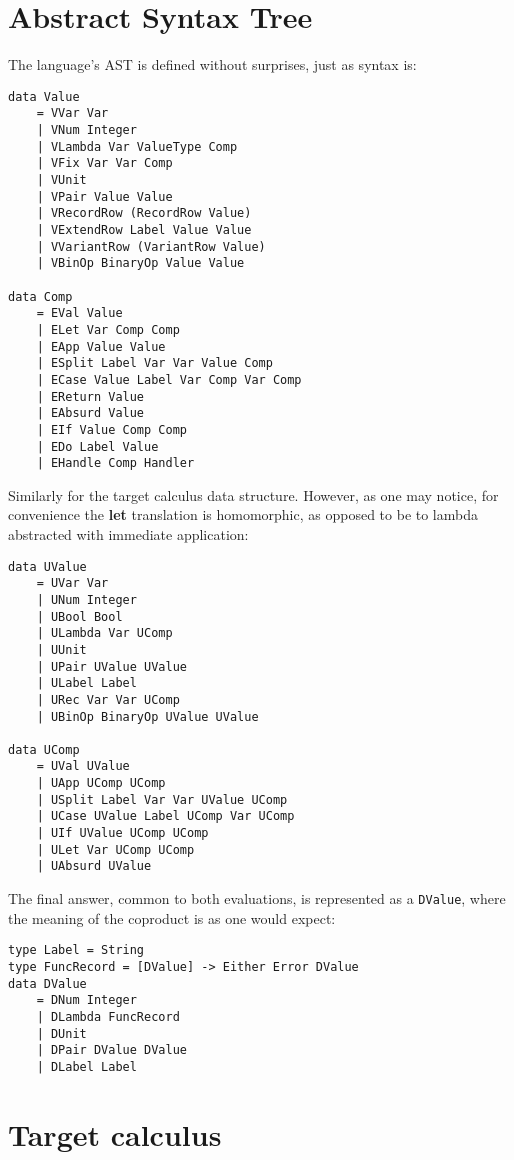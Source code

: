 \documentclass[declaration,shortabstract]{iithesis}
\theoremstyle{definition} \newtheorem{definition}{Definition}[chapter]
\theoremstyle{remark} \newtheorem{remark}[definition]{Observation}
\theoremstyle{plain} \newtheorem{theorem}[definition]{Theorem}
\theoremstyle{plain} \newtheorem{lemma}[definition]{Lemma}
\begin{document}
    \section{Abstract Syntax Tree}\label{sec:implementation-ast}

    The language's AST is defined without surprises, just as syntax is:

    \begin{verbatim}
data Value
    = VVar Var
    | VNum Integer
    | VLambda Var ValueType Comp
    | VFix Var Var Comp
    | VUnit
    | VPair Value Value
    | VRecordRow (RecordRow Value)
    | VExtendRow Label Value Value
    | VVariantRow (VariantRow Value)
    | VBinOp BinaryOp Value Value

data Comp
    = EVal Value
    | ELet Var Comp Comp
    | EApp Value Value
    | ESplit Label Var Var Value Comp
    | ECase Value Label Var Comp Var Comp
    | EReturn Value
    | EAbsurd Value
    | EIf Value Comp Comp
    | EDo Label Value
    | EHandle Comp Handler
    \end{verbatim}
    Similarly for the target calculus data structure. However, as one may notice,
    for convenience the \textbf{let} translation is homomorphic, as opposed to be
    to lambda abstracted with immediate application:

    \begin{verbatim}
data UValue
    = UVar Var
    | UNum Integer
    | UBool Bool
    | ULambda Var UComp
    | UUnit
    | UPair UValue UValue
    | ULabel Label
    | URec Var Var UComp
    | UBinOp BinaryOp UValue UValue

data UComp
    = UVal UValue
    | UApp UComp UComp
    | USplit Label Var Var UValue UComp
    | UCase UValue Label UComp Var UComp
    | UIf UValue UComp UComp
    | ULet Var UComp UComp
    | UAbsurd UValue

    \end{verbatim}
    The final answer, common to both evaluations, is represented as a \verb!DValue!,
    where the meaning of the coproduct is as one would expect:

    \begin{verbatim}
type Label = String
type FuncRecord = [DValue] -> Either Error DValue
data DValue
    = DNum Integer
    | DLambda FuncRecord
    | DUnit
    | DPair DValue DValue
    | DLabel Label
    \end{verbatim}

    \section{Target calculus}
\end{document}
